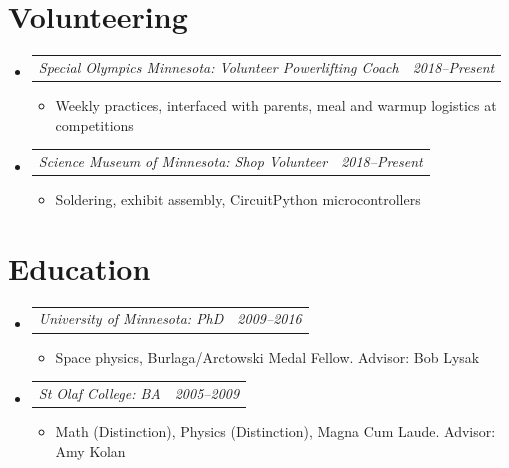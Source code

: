 \documentclass[12pt,letterpaper]{article}
\makeatletter
\newcommand{\headerpair}[2]{
    \begin{tabular*}{\linewidth}{l@{ \extracolsep{\fill} }r} {\large\emph{#1}} & {\large\emph{#2}}
    \end{tabular*}
}
\newcommand{\headerrow}[3]{\headerpair{#2: #1}{#3}}
\newcommand{\ResumeSection}[1]{\section*{{\color{MidnightBlue}#1 \sout{\hfill}}}}
\makeatother
\begin{document}

\ResumeSection{Volunteering}

\begin{itemize}[leftmargin=\parindent]
    \parskip=0.1em
    \itemsep=1.2em

    \item[]
        \headerrow
            {Volunteer Powerlifting Coach}
            {Special Olympics Minnesota}
            {2018--Present}
        \begin{itemize}[leftmargin=\parindent]
            \itemsep=0.3em

            \item Weekly practices, interfaced with parents, meal and warmup logistics at competitions
        \end{itemize}
    \item[]
        \headerrow
            {Shop Volunteer}
            {Science Museum of Minnesota}
            {2018--Present}
        \begin{itemize}[leftmargin=\parindent]
            \itemsep=0.3em

            \item Soldering, exhibit assembly, CircuitPython microcontrollers
        \end{itemize}
\end{itemize}


\ResumeSection{Education}

\begin{itemize}[leftmargin=\parindent]
    \parskip=0.1em
    \itemsep=1.2em

    \item[]
        \headerrow
            {PhD}
            {University of Minnesota}
            {2009--2016}
        \begin{itemize}[leftmargin=\parindent]
            \item Space physics, Burlaga/Arctowski Medal Fellow. Advisor: Bob Lysak

        \end{itemize}
    \item[]
        \headerrow
            {BA}
            {St Olaf College}
            {2005--2009}
        \begin{itemize}[leftmargin=\parindent]
            \item Math (Distinction), Physics (Distinction), Magna Cum Laude. Advisor: Amy Kolan
        \end{itemize}
\end{itemize}
\end{document}
